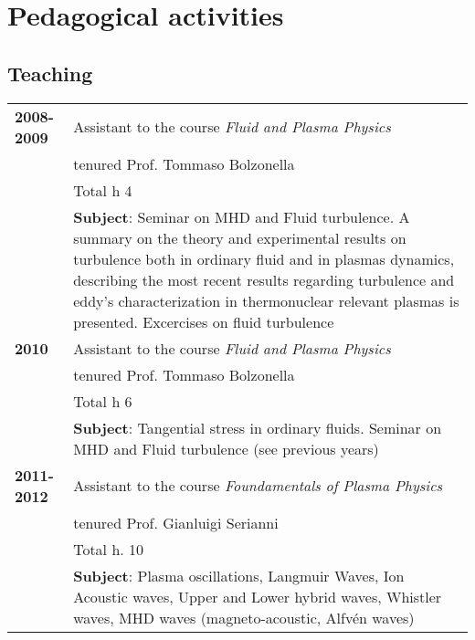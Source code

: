\section{Pedagogical activities}
\subsection{Teaching}
\begin{longtable}{>{\bfseries}l p{15cm}}
2008-2009 & Assistant to the course \emph{Fluid and Plasma
  Physics} \\
& tenured
Prof. Tommaso Bolzonella  \\
 & Total h 4  \\ 
& \textbf{Subject}: Seminar on MHD and Fluid turbulence. 
A summary on the theory and experimental results on turbulence both in
ordinary fluid and in plasmas dynamics, describing the most
recent results regarding turbulence and eddy’s characterization in
thermonuclear relevant plasmas is presented. Excercises on fluid turbulence \\
2010 &  Assistant to the course \emph{Fluid and Plasma
  Physics} \\ 
& tenured
Prof. Tommaso Bolzonella  \\
 & Total h 6  \\
& \textbf{Subject}: Tangential stress in ordinary
fluids. Seminar on MHD and Fluid turbulence (see previous years)  \\
2011-2012 & Assistant to the course \emph{Foundamentals of Plasma
  Physics} \\ 
& tenured Prof. Gianluigi Serianni \\
& Total h. 10  \\
& \textbf{Subject}: Plasma oscillations, Langmuir Waves, Ion Acoustic
waves, Upper and Lower hybrid waves, Whistler waves, MHD waves
(magneto-acoustic, Alfv\'en waves)
\end{longtable}

